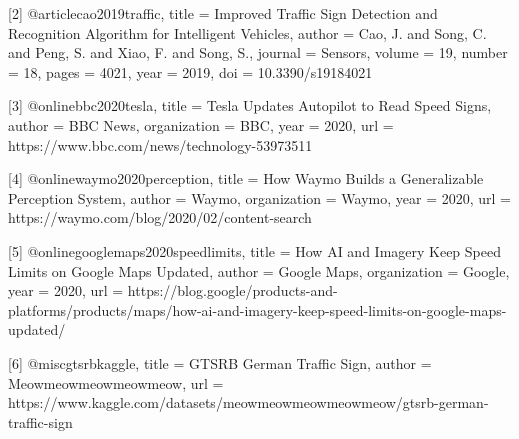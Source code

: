 \documentclass[final]{article}
\begin{document}
[2] @article{cao2019traffic,
  title   = {Improved Traffic Sign Detection and Recognition Algorithm for Intelligent Vehicles},
  author  = {Cao, J. and Song, C. and Peng, S. and Xiao, F. and Song, S.},
  journal = {Sensors},
  volume  = {19},
  number  = {18},
  pages   = {4021},
  year    = {2019},
  doi     = {10.3390/s19184021}
}

[3] @online{bbc2020tesla,
  title        = {Tesla Updates Autopilot to Read Speed Signs},
  author       = {{BBC News}},
  organization = {BBC},
  year         = {2020},
  url          = {https://www.bbc.com/news/technology-53973511}
}

[4] @online{waymo2020perception,
  title        = {How Waymo Builds a Generalizable Perception System},
  author       = {{Waymo}},
  organization = {Waymo},
  year         = {2020},
  url          = {https://waymo.com/blog/2020/02/content-search}
}

[5] @online{googlemaps2020speedlimits,
  title        = {How AI and Imagery Keep Speed Limits on Google Maps Updated},
  author       = {{Google Maps}},
  organization = {Google},
  year         = {2020},
  url          = {https://blog.google/products-and-platforms/products/maps/how-ai-and-imagery-keep-speed-limits-on-google-maps-updated/}
}

[6] @misc{gtsrbkaggle,
  title        = {GTSRB German Traffic Sign},
  author       = {Meowmeowmeowmeowmeow},
  url = {https://www.kaggle.com/datasets/meowmeowmeowmeowmeow/gtsrb-german-traffic-sign}
}
\end{document}
